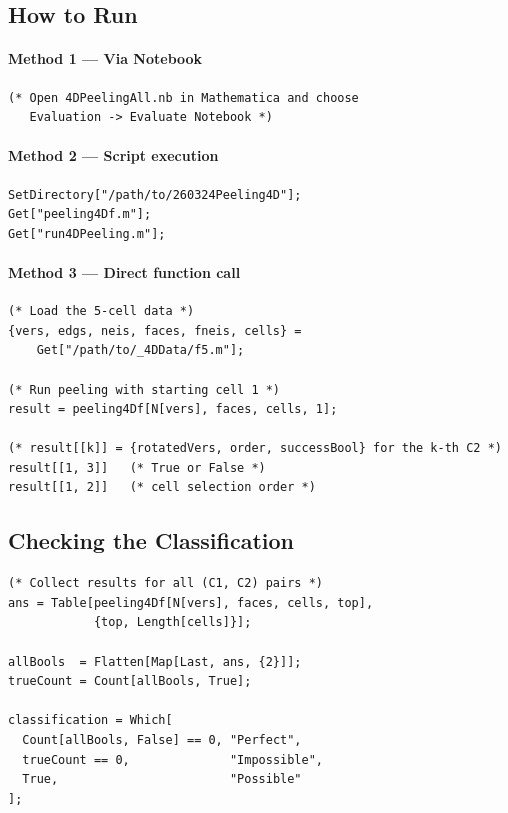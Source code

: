 \documentclass[12pt,a4paper]{article}
\theoremstyle{definition}
\begin{document}
\subsection{How to Run}

\paragraph{Method 1 --- Via Notebook}
\begin{lstlisting}
(* Open 4DPeelingAll.nb in Mathematica and choose
   Evaluation -> Evaluate Notebook *)
\end{lstlisting}

\paragraph{Method 2 --- Script execution}
\begin{lstlisting}
SetDirectory["/path/to/260324Peeling4D"];
Get["peeling4Df.m"];
Get["run4DPeeling.m"];
\end{lstlisting}

\paragraph{Method 3 --- Direct function call}
\begin{lstlisting}
(* Load the 5-cell data *)
{vers, edgs, neis, faces, fneis, cells} =
    Get["/path/to/_4DData/f5.m"];

(* Run peeling with starting cell 1 *)
result = peeling4Df[N[vers], faces, cells, 1];

(* result[[k]] = {rotatedVers, order, successBool} for the k-th C2 *)
result[[1, 3]]   (* True or False *)
result[[1, 2]]   (* cell selection order *)
\end{lstlisting}

\subsection{Checking the Classification}

\begin{lstlisting}
(* Collect results for all (C1, C2) pairs *)
ans = Table[peeling4Df[N[vers], faces, cells, top],
            {top, Length[cells]}];

allBools  = Flatten[Map[Last, ans, {2}]];
trueCount = Count[allBools, True];

classification = Which[
  Count[allBools, False] == 0, "Perfect",
  trueCount == 0,              "Impossible",
  True,                        "Possible"
];
\end{lstlisting}
\end{document}
